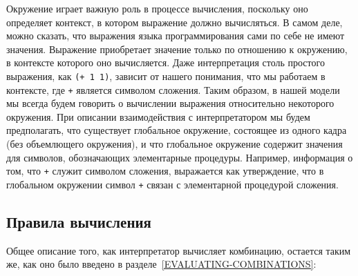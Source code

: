 {
Окружение играет важную роль в процессе вычисления, поскольку
оно определяет контекст, в котором выражение должно вычисляться.
В самом деле, можно сказать, что выражения языка программирования сами
по себе не имеют значения. Выражение приобретает значение только по
отношению к окружению, в контексте которого оно вычисляется.  Даже
интерпретация столь простого выражения, как {\tt (+ 1 1)},
зависит от нашего понимания, что мы работаем в контексте, где
{\tt +} является символом сложения.  Таким образом, в нашей
модели мы всегда будем говорить о вычислении выражения относительно
некоторого окружения.  При описании взаимодействия с интерпретатором
мы будем предполагать, что существует
глобальное окружение, состоящее
из одного кадра (без объемлющего окружения), и что глобальное
окружение содержит значения для символов, обозначающих элементарные
процедуры.  Например, информация о том, что {\tt +} служит
символом сложения, выражается как утверждение, что в глобальном
окружении символ {\tt +} связан с элементарной процедурой
сложения.

}

\subsection{Правила вычисления}
\label{THE-RULES-FOR-EVALUATION}


Общее описание того, как интерпретатор вычисляет
комбинацию, остается таким же, как оно было введено в
разделе~\ref{EVALUATING-COMBINATIONS}:

\pagebreak

